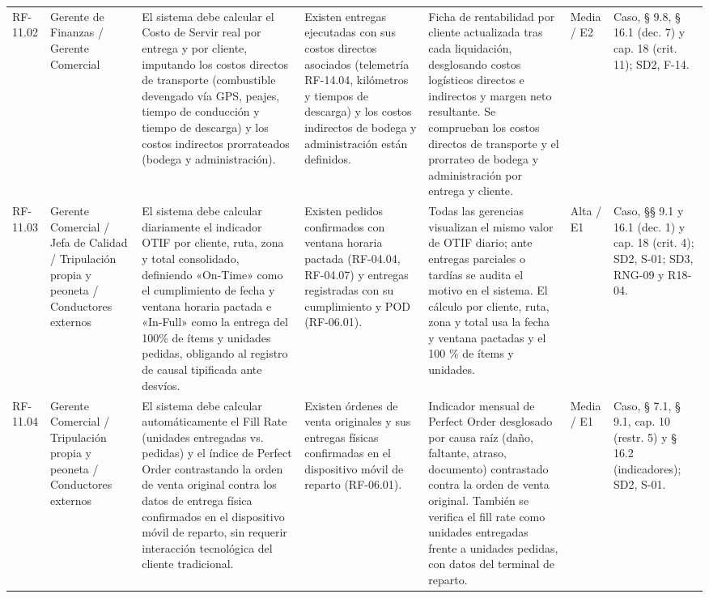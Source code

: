 {\begin{longtable}{@{}F{0.062} F{0.080} F{0.195} F{0.160} F{0.240} F{0.093} F{0.170}@{}}
  RF-11.02 & Gerente de Finanzas / Gerente Comercial & El sistema debe calcular el Costo de Servir real por entrega y por cliente, imputando los costos directos de transporte (combustible devengado vía GPS, peajes, tiempo de conducción y tiempo de descarga) y los costos indirectos prorrateados (bodega y administración). & Existen entregas ejecutadas con sus costos directos asociados (telemetría RF-14.04, kilómetros y tiempos de descarga) y los costos indirectos de bodega y administración están definidos. & Ficha de rentabilidad por cliente actualizada tras cada liquidación, desglosando costos logísticos directos e indirectos y margen neto resultante. Se comprueban los costos directos de transporte y el prorrateo de bodega y administración por entrega y cliente. & Media / E2 & Caso, § 9.8, § 16.1 (dec. 7) y cap. 18 (crit. 11); SD2, F-14. \\
  RF-11.03 & Gerente Comercial / Jefa de Calidad / Tripulación propia y peoneta / Conductores externos & El sistema debe calcular diariamente el indicador OTIF por cliente, ruta, zona y total consolidado, definiendo «On-Time» como el cumplimiento de fecha y ventana horaria pactada e «In-Full» como la entrega del 100\% de ítems y unidades pedidas, obligando al registro de causal tipificada ante desvíos. & Existen pedidos confirmados con ventana horaria pactada (RF-04.04, RF-04.07) y entregas registradas con su cumplimiento y POD (RF-06.01). & Todas las gerencias visualizan el mismo valor de OTIF diario; ante entregas parciales o tardías se audita el motivo en el sistema. El cálculo por cliente, ruta, zona y total usa la fecha y ventana pactadas y el 100 \% de ítems y unidades. & Alta / E1 & Caso, §§ 9.1 y 16.1 (dec. 1) y cap. 18 (crit. 4); SD2, S-01; SD3, RNG-09 y R18-04. \\
  RF-11.04 & Gerente Comercial / Tripulación propia y peoneta / Conductores externos & El sistema debe calcular automáticamente el Fill Rate (unidades entregadas vs. pedidas) y el índice de Perfect Order contrastando la orden de venta original contra los datos de entrega física confirmados en el dispositivo móvil de reparto, sin requerir interacción tecnológica del cliente tradicional. & Existen órdenes de venta originales y sus entregas físicas confirmadas en el dispositivo móvil de reparto (RF-06.01). & Indicador mensual de Perfect Order desglosado por causa raíz (daño, faltante, atraso, documento) contrastado contra la orden de venta original. También se verifica el fill rate como unidades entregadas frente a unidades pedidas, con datos del terminal de reparto. & Media / E1 & Caso, § 7.1, § 9.1, cap. 10 (restr. 5) y § 16.2 (indicadores); SD2, S-01. \\

\end{longtable}}
